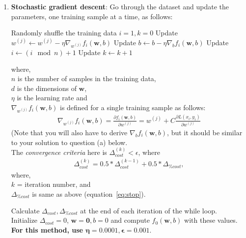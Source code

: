 \begin{enumerate}
\item  \textbf{Stochastic gradient descent}: Go through the dataset and update the parameters, one training sample at a time, as follows:
\begin{algorithmic}
\STATE Randomly shuffle the training data
\STATE $i = 1, k = 0$
\STATE Update $w^{(j)} \leftarrow w^{(j)} - \eta \nabla_{w^{(j)}} f_{i}(\mathbf{w},b)$
\ENDFOR
\STATE Update $b \leftarrow b - \eta \nabla_{b} f_{i}(\mathbf{w},b)$
\STATE Update $i \leftarrow (i \mod n) + 1$
\STATE Update $k \leftarrow k+1$
\ENDWHILE
\end{algorithmic}
where,\\
 $n$ is the number of samples in the training data,\\
 $d$ is the dimensions of $\mathbf{w}$, \\
 $\eta$ is the learning rate and\\
 $\nabla_{w^{(j)}}  f_{i}(\mathbf{w},b)$ is defined for a single training sample as follows: 
\begin{align*}
\nabla_{w^{(j)}} f_{i}(\mathbf{w},b)  = \frac{\partial f_{i}(\mathbf{w},b)}{\partial w^{(j)}} = w^{(j)} + C \frac{\partial L(x_i, y_i)}{\partial w^{(j)}} 
\end{align*}
(Note that you will also have to derive $\nabla_{b} f_{i}(\mathbf{w},b)$, but it should be similar to your solution to question (a) below.\\
The {\em convergence criteria} here is $\Delta_{cost}^{(k)} < \epsilon$, where  
\begin{align*}
\Delta_{cost}^{(k)} = 0.5*\Delta_{cost}^{(k-1)} + 0.5*\Delta_{\% cost},
\end{align*}  
where,\\
$k$ = iteration number, and\\
$\Delta_{\% cost}$ is same as above (equation~\ref{eq:stop}). 

Calculate $\Delta_{cost}, \Delta_{\% cost}$ at the end of each iteration of the while loop. \\
Initialize $\Delta_{cost} = 0$, $\mathbf{w = 0}, b = 0$ and compute $f_{0}(\mathbf{w}, b)$ with these values.\\
\textbf{For this method, use $\mathbf{\eta = 0.0001, \epsilon = 0.001}$}.



\end{enumerate}
